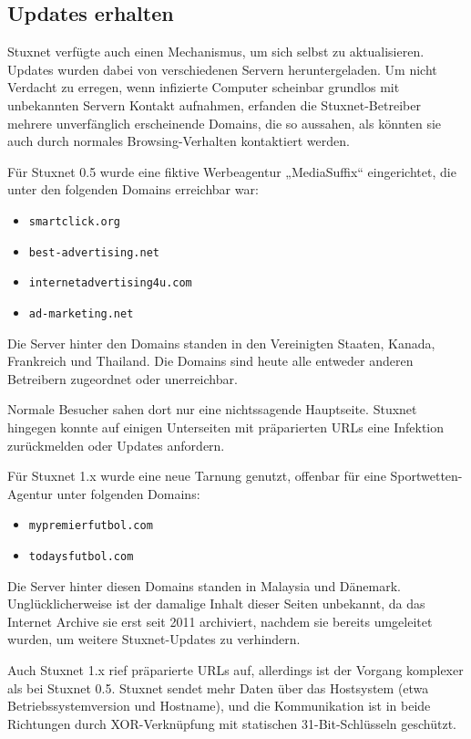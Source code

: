 \documentclass[a4paper]{article}
\begin{document}
\subsection{Updates erhalten}

Stuxnet verfügte auch einen Mechanismus, um sich selbst zu aktualisieren.
Updates wurden dabei von verschiedenen Servern heruntergeladen.
Um nicht Verdacht zu erregen, wenn infizierte Computer scheinbar grundlos mit unbekannten Servern Kontakt aufnahmen,
erfanden die Stuxnet-Betreiber mehrere unverfänglich erscheinende Domains,
die so aussahen, als könnten sie auch durch normales Browsing-Verhalten kontaktiert werden.

Für Stuxnet 0.5 wurde eine fiktive Werbeagentur „MediaSuffix“ eingerichtet, die unter den folgenden Domains erreichbar war:

\begin{itemize}
\item \texttt{smartclick.org}
\item \texttt{best-advertising.net}
\item \texttt{internetadvertising4u.com}
\item \texttt{ad-marketing.net}
\end{itemize}

Die Server hinter den Domains standen in den Vereinigten Staaten, Kanada, Frankreich und Thailand. %
Die Domains sind heute alle entweder anderen Betreibern zugeordnet oder unerreichbar.

Normale Besucher sahen dort nur eine nichtssagende Hauptseite\cite{archive_best_advertising}.
Stuxnet hingegen konnte auf einigen Unterseiten mit präparierten URLs eine Infektion zurückmelden oder Updates anfordern.

Für Stuxnet 1.x wurde eine neue Tarnung genutzt, offenbar für eine Sport\-wet\-ten-Agentur unter folgenden Domains:

\begin{itemize}
\item \texttt{mypremierfutbol.com}
\item \texttt{todaysfutbol.com}
\end{itemize}

Die Server hinter diesen Domains standen in Malaysia und Dänemark.
Un\-glück\-li\-cher\-wei\-se ist der damalige Inhalt dieser Seiten unbekannt,
da das Internet Archive sie erst seit 2011 archiviert,
nachdem sie bereits umgeleitet wurden, um weitere Stuxnet-Updates zu verhindern.

Auch Stuxnet 1.x rief präparierte URLs auf,
allerdings ist der Vorgang komplexer als bei Stuxnet 0.5.
Stuxnet sendet mehr Daten über das Hostsystem (etwa Betriebssystemversion und Hostname),
und die Kommunikation ist in beide Richtungen durch XOR-Verknüpfung mit statischen 31-Bit-Schlüsseln geschützt.
\end{document}
